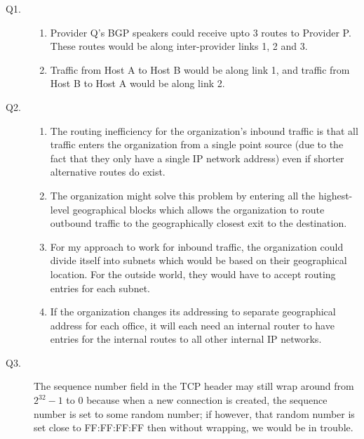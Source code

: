 \documentclass{csc_assignment}
\begin{document}
\begin{description}

\item[Q1.]
\begin{enumerate}
\item Provider Q's BGP speakers could receive upto 3 routes to Provider P. These routes would be along inter-provider links 1, 2 and 3.
\item Traffic from Host A to Host B would be along link 1, and traffic from Host B to Host A would be along link 2.
\end{enumerate}


\item[Q2.]
\begin{enumerate}
\item The routing inefficiency for the organization's inbound traffic is that all traffic enters the organization from a single point source (due to the fact that they only have a single IP network address) even if shorter alternative routes do exist. 
\item The organization might solve this problem by entering all the highest-level geographical blocks which allows the organization to route outbound traffic to the geographically closest exit to the destination.
\item For my approach to work for inbound traffic, the organization could divide itself into subnets which would be based on their geographical location. For the outside world, they would have to accept routing entries for each subnet. 
\item If the organization changes its addressing to separate geographical address for each office, it will each need an internal router to have entries for the internal routes to all other internal IP networks.
\end{enumerate}


\item[Q3.]
The sequence number field in the TCP header may still wrap around from $2^{32}-1$ to $0$ because when a new connection is created, the sequence number is set to some random number; if however, that random number is set close to FF:FF:FF:FF then without wrapping, we would be in trouble.


\end{description}
\end{document}
